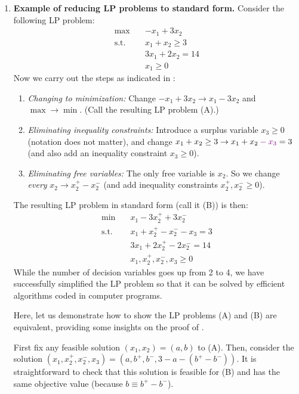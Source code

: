 \begin{enumerate}
\item \textbf{Example of reducing LP problems to standard form.} Consider the
following LP problem:
\begin{align*}
\text{max}\quad&-x_1+3x_2 \\
\text{s.t.}\quad&x_1+x_2\ge 3\\
\quad&3x_1+2x_2=14 \\
\quad&x_1\ge 0
\end{align*}
Now we carry out the steps as indicated in :
\begin{enumerate}[label={(\arabic*)}]
\item \emph{Changing to minimization:} Change \(-x_1+3x_2\to x_1-3x_2\) and \(\max\to\min\). (Call the resulting LP problem (A).)
\item \emph{Eliminating inequality constraints:} Introduce a surplus variable
\(x_3\ge 0\) (notation does not matter), and change \(x_1+x_2\ge 3\to
x_1+x_2\vc{-x_3}=3\) (and also add an inequality constraint \(x_3\ge 0\)).
\item \emph{Eliminating free variables:} The only free variable is \(x_2\). So
we change \emph{every} \(x_2\to x_2^{+}-x_2^{-}\) (and add inequality
constraints \(x_2^{+},x_2^{-}\ge 0\)).
\end{enumerate}
The resulting LP problem in standard form (call it (B)) is then:
\begin{align*}
\text{min}\quad&x_1-3x_2^{+}+3x_2^{-} \\
\text{s.t.}\quad&x_1+x_2^{+}-x_2^{-}-x_3= 3\\
\quad&3x_1+2x_2^{+}-2x_2^{-}=14 \\
\quad&x_1,x_2^{+},x_2^{-},x_3\ge 0
\end{align*}
While the number of decision variables goes up from 2 to 4, we have
successfully simplified the LP problem so that it can be solved by efficient
algorithms coded in computer programs.

Here, let us demonstrate how to show the LP problems (A) and (B) are
equivalent, providing some insights on the proof of .

\begin{pf}
First fix any feasible solution \((x_1,x_2)=(a,b)\) to (A). Then, consider the
solution \((x_1,x_2^{+},x_2^{-},x_3)=(a,b^{+},b^{-},3-a-(b^{+}-b^{-}))\).
It is straightforward to check that this solution is feasible for (B) and has
the same objective value (because \(b\equiv b^{+}-b^{-}\)).


\end{pf}
\end{enumerate}
